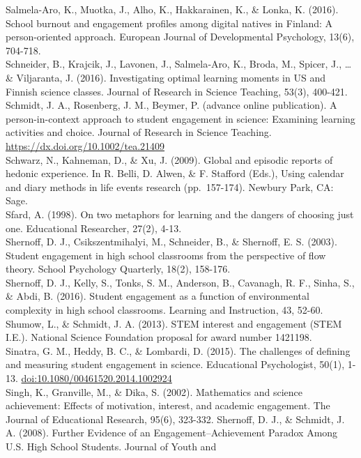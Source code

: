 \documentclass[]{book}
\theoremstyle{definition}
\theoremstyle{definition}
\theoremstyle{definition}
\theoremstyle{remark}
\begin{document}
Salmela-Aro, K., Muotka, J., Alho, K., Hakkarainen, K., \& Lonka, K.
(2016). School burnout and engagement profiles among digital natives in
Finland: A person-oriented approach. European Journal of Developmental
Psychology, 13(6), 704-718.\\
Schneider, B., Krajcik, J., Lavonen, J., Salmela‐Aro, K., Broda, M.,
Spicer, J., \ldots{} \& Viljaranta, J. (2016). Investigating optimal
learning moments in US and Finnish science classes. Journal of Research
in Science Teaching, 53(3), 400-421.\\
Schmidt, J. A., Rosenberg, J. M., Beymer, P. (advance online
publication). A person-in-context approach to student engagement in
science: Examining learning activities and choice. Journal of Research
in Science Teaching. \url{https://dx.doi.org/10.1002/tea.21409}\\
Schwarz, N., Kahneman, D., \& Xu, J. (2009). Global and episodic reports
of hedonic experience. In R. Belli, D. Alwen, \& F. Stafford (Eds.),
Using calendar and diary methods in life events research (pp.~157-174).
Newbury Park, CA: Sage.\\
Sfard, A. (1998). On two metaphors for learning and the dangers of
choosing just one. Educational Researcher, 27(2), 4-13.\\
Shernoff, D. J., Csikszentmihalyi, M., Schneider, B., \& Shernoff, E. S.
(2003). Student engagement in high school classrooms from the
perspective of flow theory. School Psychology Quarterly, 18(2),
158-176.\\
Shernoff, D. J., Kelly, S., Tonks, S. M., Anderson, B., Cavanagh, R. F.,
Sinha, S., \& Abdi, B. (2016). Student engagement as a function of
environmental complexity in high school classrooms. Learning and
Instruction, 43, 52-60.\\
Shumow, L., \& Schmidt, J. A. (2013). STEM interest and engagement (STEM
I.E.). National Science Foundation proposal for award number 1421198.\\
Sinatra, G. M., Heddy, B. C., \& Lombardi, D. (2015). The challenges of
defining and measuring student engagement in science. Educational
Psychologist, 50(1), 1-13. \url{doi:10.1080/00461520.2014.1002924}\\
Singh, K., Granville, M., \& Dika, S. (2002). Mathematics and science
achievement: Effects of motivation, interest, and academic engagement.
The Journal of Educational Research, 95(6), 323-332. Shernoff, D. J., \&
Schmidt, J. A. (2008). Further Evidence of an Engagement--Achievement
Paradox Among U.S. High School Students. Journal of Youth and
\end{document}
